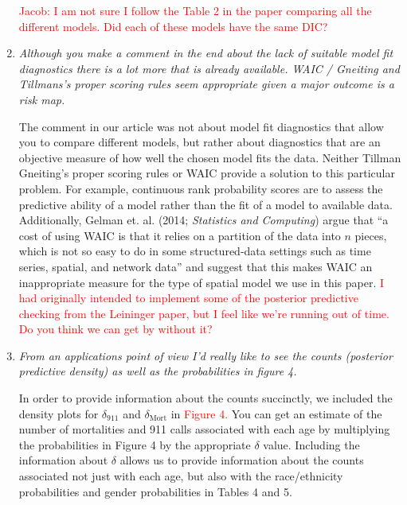 \documentclass{article}
\begin{document}
\begin{enumerate}
\textcolor{red}{Jacob: I am not sure I follow the Table 2 in the paper comparing all the different models.  Did each of these models have the same DIC?}

\item\textit{Although you make a comment in the end about the lack of suitable model fit diagnostics there is a lot more that is already available.   WAIC / Gneiting and Tillmans's proper scoring rules seem appropriate given a major outcome is a risk map.}

The comment in our article was not about model fit diagnostics that allow you to compare different models, but rather about diagnostics that are an objective measure of how well the chosen model fits the data. Neither Tillman Gneiting's proper scoring rules or WAIC provide a solution to this particular problem. For example, continuous rank probability scores are to assess the predictive ability of a model rather than the fit of a model to available data. Additionally, Gelman et. al. (2014; \textit{Statistics and Computing}) argue that ``a cost of using WAIC is that it relies on a partition of the data into $n$ pieces, which is not so easy to do in some structured-data settings such as time series, spatial, and network data'' and suggest that this makes WAIC an inappropriate measure for the type of spatial model we use in this paper. \textcolor{red}{I had originally intended to implement some of the posterior predictive checking from the Leininger paper, but I feel like we're running out of time. Do you think we can get by without it?}

\item\textit{From an applications point of view I'd really like to see the counts (posterior predictive density) as well as the probabilities in figure 4.}

In order to provide information about the counts succinctly, we included the density plots for $\delta_{911}$ and $\delta_{\text{Mort}}$ in \textcolor{red}{Figure 4.} You can get an estimate of the number of mortalities and 911 calls associated with each age by multiplying the probabilities in Figure 4 by the appropriate $\delta$ value. Including the information about $\delta$ allows us to provide information about the counts associated not just with each age, but also with the race/ethnicity probabilities and gender probabilities in Tables 4 and 5. 

\end{enumerate}
\end{document}
